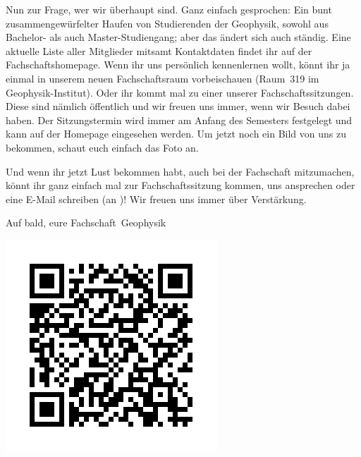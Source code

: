\begin{multicols*}{2}
Nun zur Frage, wer wir überhaupt sind.
Ganz einfach gesprochen:
Ein bunt zusammengewürfelter Haufen von Studierenden der Geophysik, sowohl aus Bachelor- als auch Master-Studiengang; aber das ändert sich auch ständig.
Eine aktuelle Liste aller Mitglieder mitsamt Kontaktdaten findet ihr auf der Fachschaftshomepage.
Wenn ihr uns persönlich kennenlernen wollt, könnt ihr ja einmal in unserem neuen Fachschaftsraum vorbeischauen (Raum~319 im Geophysik-Institut).
Oder ihr kommt mal zu einer unserer Fachschaftssitzungen.
Diese sind nämlich öffentlich und wir freuen uns immer, wenn wir Besuch dabei haben.
Der Sitzungstermin wird immer am Anfang des Semesters festgelegt und kann auf der Homepage eingesehen werden.
Um jetzt noch ein Bild von uns zu bekommen, schaut euch einfach das Foto an.

Und wenn ihr jetzt Lust bekommen habt, auch bei der Fachschaft mitzumachen, könnt ihr ganz einfach mal zur Fachschaftssitzung kommen, uns ansprechen oder eine E-Mail schreiben (an )!
Wir freuen uns immer über Verstärkung.

Auf bald, eure Fachschaft~Geophysik

\begin{center}
	\includegraphics[width=0.8\columnwidth]{res/FS_Geophysik_QR_Website2025.png}
\end{center}
\end{multicols*}

